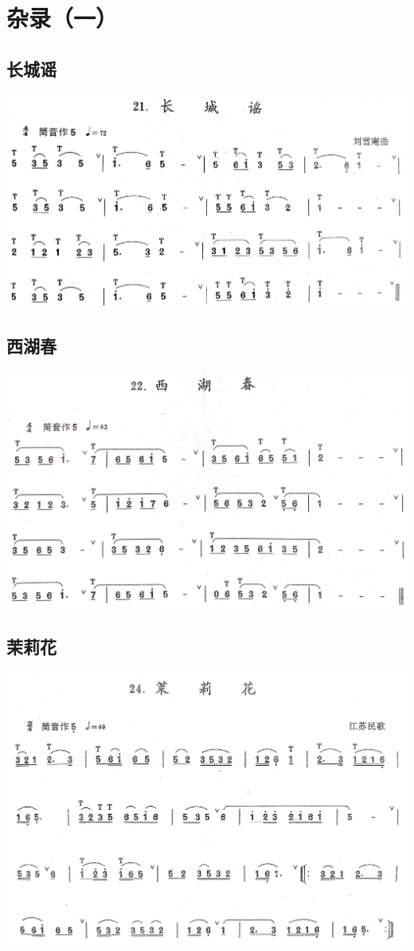 \documentclass[cn,pad,twocol]{elegantbook}
\begin{document}
\chapter{杂录（一）}
\section{长城谣}    \includegraphics[width=\textwidth]{dongxiao/20200711-长城谣.jpg}
\section{西湖春}    \includegraphics[width=\textwidth]{dongxiao/20200711-西湖春.jpg}
\section{茉莉花}    \includegraphics[width=\textwidth]{dongxiao/20200711-茉莉花.jpg}
\end{document}
